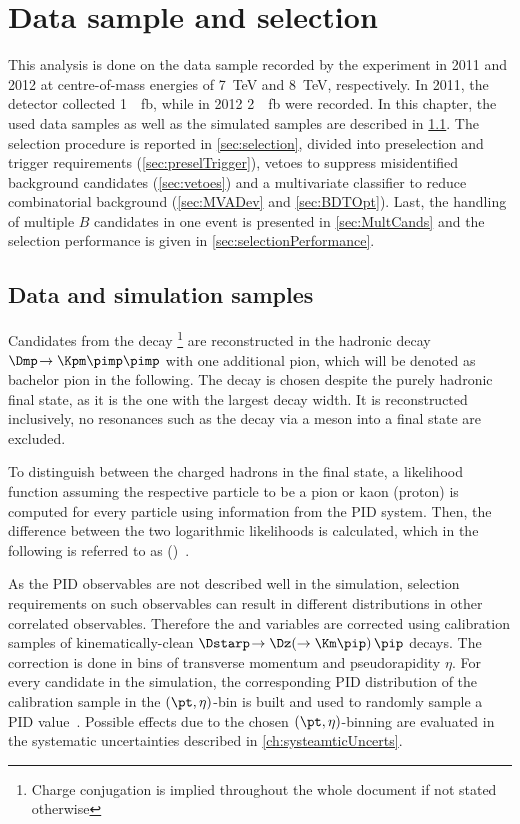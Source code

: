 \chapter{Data sample and selection}

\linespread{1.08}\selectfont
This analysis is done on the data sample recorded by the \lhcb experiment in \num{2011} and \num{2012} at centre-of-mass energies of \SI{7}{\tera\electronvolt} and \SI{8}{\tera\electronvolt}, respectively.
In \num{2011}, the detector collected \SI{1}{\per\femto\barn}, while in \num{2012} \SI{2}{\per\femto\barn} were recorded.
In this chapter, the used data samples as well as the simulated samples are described in \cref{sec:Samples}.
The selection procedure is reported in \cref{sec:selection}, divided into preselection and trigger requirements (\cref{sec:preselTrigger}), vetoes to suppress \eg misidentified background candidates (\cref{sec:vetoes}) and a multivariate classifier to reduce combinatorial background (\cref{sec:MVADev} and \cref{sec:BDTOpt}).
Last, the handling of multiple $B$ candidates in one event is presented in \cref{sec:MultCands} and the selection performance is given in \cref{sec:selectionPerformance}.

\section{Data and simulation samples}
\label{sec:Samples}

Candidates from the decay \BdToDpi\footnote{Charge conjugation is implied throughout the whole document if not stated otherwise} are reconstructed in the hadronic decay $\Dmp\!\to\Kpm\pimp\pimp$ with one additional pion, which will be denoted as bachelor pion in the following.
The \D decay is chosen despite the purely hadronic final state, as it is the one with the largest decay width.
It is reconstructed inclusively, \ie no resonances such as the decay via a \Kstarz meson into a \kaon\pion final state are excluded.

To distinguish between the charged hadrons in the final state, a likelihood function assuming the respective particle to be a pion or kaon (proton) is computed for every particle using information from the PID system.
Then, the difference between the two logarithmic likelihoods is calculated, which in the following is referred to as \dllkpi (\dllppi)~\cite{Aaij:2014jba}.

As the PID observables are not described well in the simulation, selection requirements on such observables can result in different distributions in other correlated observables.
Therefore the \dllkpi and \dllppi variables are corrected using calibration samples of kinematically-clean $\Dstarp\!\to\Dz\!\left(\to\Km\pip\right)\pip$ decays.
The correction is done in bins of transverse momentum \pt and pseudorapidity $\eta$.
For every candidate in the simulation, the corresponding PID distribution of the calibration sample in the $(\pt,\eta)$-bin is built and used to randomly sample a PID value~\cite{Anderlini:2202412}.
Possible effects due to the chosen $(\pt,\eta)$-binning are evaluated in the systematic uncertainties described in \cref{ch:systeamticUncerts}.

